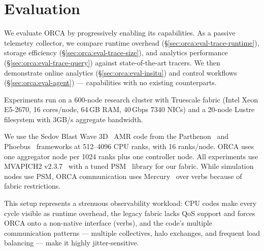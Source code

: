 
\def\takeawaygap{0.3em}

\newcommand{\takeaway}[1]{%
  \vspace{\takeawaygap}%
  \noindent\emph{\textbf{Takeaway:} #1}%
  \vspace{\takeawaygap}%
}


\section{Evaluation}\label{sec:orca:eval}

\figEvalOverhead{}

We evaluate ORCA by progressively enabling its capabilities.
As a passive telemetry collector, we compare runtime overhead
(\S\ref{sec:orca:eval-trace-runtime}), storage efficiency (\S\ref{sec:orca:eval-trace-size}), and
analytics performance (\S\ref{sec:orca:eval-trace-query}) against state-of-the-art tracers.
We then demonstrate online analytics (\S\ref{sec:orca:eval-insitu}) and control workflows
(\S\ref{sec:orca:eval-agent}) --- capabilities with no existing counterparts.

Experiments run on a 600-node research cluster with \qlogic{} Truescale fabric (Intel Xeon E5-2670,
16 cores/node, 64\,GB RAM, 40\,Gbps \qlogic{} 7340 NICs) and a 20-node Lustre filesystem with 3GB/s
aggregate bandwidth.

We use the Sedov Blast Wave 3D~\cite{Sedov1959:SimilarityDimensionalMethods} AMR code from the
Parthenon~\cite{Grete2023:Parthenon} and Phoebus~\cite{Barke2024:Phoebus} frameworks at 512--4096
CPU ranks, with 16 ranks/node.
ORCA uses one aggregator node per 1024 ranks plus one controller node.
All experiments use MVAPICH2 v2.3.7~\cite{Panda2021:MVAPICH} with a tuned PSM~\cite{2025:PSM}
library for our fabric.
While simulation nodes use PSM, ORCA communication uses Mercury~\cite{Souma2013:MercuryRPC} over
verbs because of fabric restrictions.

This setup represents a strenuous observability workload: CPU codes make every cycle visible as
runtime overhead, the legacy fabric lacks QoS support and forces ORCA onto a non-native interface
(verbs), and the code's multiple communication patterns --- multiple collectives, halo exchanges,
and frequent load balancing --- make it highly jitter-sensitive.

